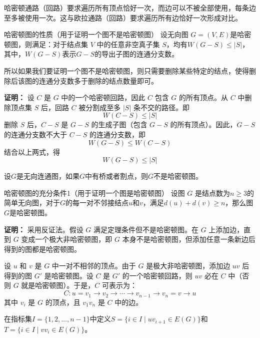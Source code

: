 \documentclass[lang=cn,11pt]{elegantbook}
\begin{document}
哈密顿通路（回路）要求遍历所有顶点恰好一次，而边可以不被全部使用，每条边至多被使用一次。这与欧拉通路（回路）要求遍历所有边恰好一次形成对比。
\begin{theorem}{哈密顿图的性质（用于证明一个图不是哈密顿图）}
    设无向图 $G=(V,E)$是哈密顿图，则满足：对于结点集 $V$ 中的任意非空真子集 $S$，均有$W(G-S)\leqslant |S|$，其中，$W(G-S)$表示$G-S$的导出子图的连通分支数。

    所以如果我们要证明一个图不是哈密顿图，则只需要删除某些特定的结点，使得删除后该图的连通分支数多于删除的结点数量即可。
\end{theorem}
\textbf{证明：}
    设 $C$ 是 $G$ 中的一个哈密顿回路，因此 $C$ 包含 $G$ 的所有顶点。从 $C$ 中删除顶点集 $S$ 后，回路 $C$ 被分割成至多 $|S|$ 条不交的路径。即
    \[
    W(C - S) \leqslant |S|
    \]
删除 $S$ 后，$C - S$ 是 $G - S$ 的生成子图（包含 $G - S$ 的所有顶点）。因此，$G - S$ 的连通分支数不大于 $C - S$ 的连通分支数，即
    \[
    W(G - S) \leqslant W(C - S)
    \]
    结合以上两式，得
    \[
    W(G - S) \leqslant |S|
    \]
\begin{example}[推论]
    设$G$是无向连通图，如果$G$中有桥或者割点，则$G$不是哈密顿图。
\end{example}
\begin{theorem}{哈密顿图的充分条件1（用于证明一个图是哈密顿图）}
设图 $G$ 是结点数为$n\geqslant3$的简单无向图，对于$G$的每一对不邻接结点$u$和$v$，满足$d(u)+d(v)\geqslant n$，那么图$G$是哈密顿图。
\end{theorem}
\textbf{证明：}
采用反证法。假设 $G$ 满足定理条件但不是哈密顿图。在 $G$ 上添加边，直到 $G$ 变成一个极大非哈密顿图，即 $G$ 本身不是哈密顿图，但添加任意一条新边后得到的图都是哈密顿图。

设 $u$ 和 $v$ 是 $G$ 中一对不相邻的顶点。由于 $G$ 是极大非哈密顿图，添加边 $uv$ 后得到的图 $G'$ 是哈密顿图。设 $C$ 是 $G'$ 的一个哈密顿回路，则 $uv$ 必在 $C$ 中（否则 $G$ 就是哈密顿图）。于是，$C$ 可表示为：
\[
C: u = v_1 \to v_2 \to \cdots \to v_{n-1} \to v_n = v \to u
\]
其中 $v_i$ 是 $G$ 的顶点，且 $v_1 v_n$ 是 $C$ 中的边。

在指标集$I=\{1,2,\ldots,n-1\}$中定义$S=\{i\in I\mid uv_{i+1}\in E(G)\}$和$T=\{i\in I\mid vv_i\in E(G)\}$。
\end{document}
